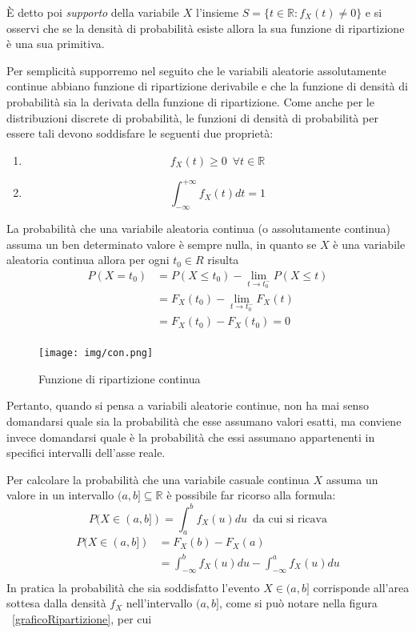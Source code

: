 \documentclass[a4paper,12pt, oneside]{book}
\newcommand{\numberset}{\mathbb}
\newcommand{\R}{\numberset{R}}
\begin{document}
È detto poi \emph{supporto} della variabile $X$ l'insieme $S = \{t \in \R : f_X(t) \neq 0\}$
e si osservi che se la densità di probabilità esiste allora la sua funzione di ripartizione è una sua
primitiva.

Per semplicità supporremo nel seguito che le variabili aleatorie assolutamente continue abbiano funzione
di ripartizione derivabile e che la funzione di densità di probabilità sia la derivata della funzione di ripartizione.\newline
Come anche per le distribuzioni discrete di probabilità, le funzioni di densità di probabilità 
per essere tali devono soddisfare le seguenti due proprietà:
\begin{enumerate}
    \item \[f_X(t) \geq 0\,\,\, \forall t \in \R\]
    \item \[\int _{-\infty}^{+\infty} f_X(t)dt = 1\]
\end{enumerate}
La probabilità che una variabile aleatoria continua (o assolutamente continua) assuma un ben determinato valore
è sempre nulla, in quanto se $X$ è una variabile aleatoria continua allora per ogni $t_0 \in R$ risulta
\[ \begin{split}
    P(X = t_0) & = P(X \leq t_0) - \lim _{t \to t_0^-} P(X \leq t) \\
               & = F_X(t_0) - \lim_{t \to t_0^-} F_X(t) \\
               & = F_X(t_0) - F_X(t_0) = 0\\
   \end{split} \]

\begin{figure}
    \centering
    \caption{Funzione di ripartizione continua}
    \label{img:ripartizioneContinua}
    \texttt{[image: img/con.png]}
\end{figure}
Pertanto, quando si pensa a variabili aleatorie continue, non ha mai senso domandarsi quale sia la probabilità
che esse assumano valori esatti, ma conviene invece domandarsi quale è la probabilità che essi assumano 
appartenenti in specifici intervalli dell'asse reale.

Per calcolare la probabilità che una variabile casuale continua $X$ assuma un valore in un intervallo 
$(a,b] \subseteq \R$ è possibile far ricorso alla formula:
\[ P(X \in (a,b]) = \int _a ^b f_X(u)du\,\,\,  \text{da cui si ricava}\]
\[ \begin{split}
    P(X \in (a, b]) & = F_X(b) - F_X(a) \\
                    & = \int_{-\infty}^b f_X(u)du - \int_{-\infty}^a f_X(u)du\\
   \end{split} \]
In pratica la probabilità che sia soddisfatto l'evento $X\in(a,b]$ corrisponde all'area sottesa
dalla densità $f_X$ nell'intervallo $(a,b]$, come si può notare nella figura ~\ref{graficoRipartizione}, per cui
\end{document}
